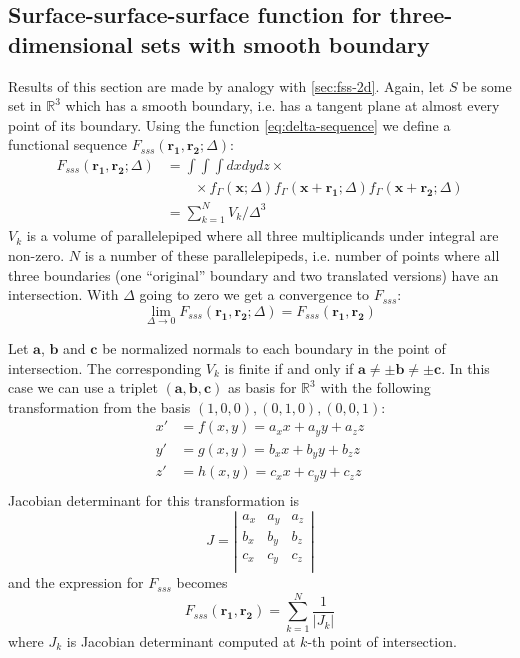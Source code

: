\documentclass[reprint,amsmath,amssymb,aps,pre,showkeys,showpacs]{revtex4-1}
\begin{document}
\subsection{Surface-surface-surface function for three-dimensional sets with
  smooth boundary}
\label{sec:fsss-3d}
Results of this section are made by analogy with \cref{sec:fss-2d}. Again, let
$S$ be some set in $\mathbb{R}^3$ which has a smooth boundary, i.e. has a
tangent plane at almost every point of its boundary. Using the function
\cref{eq:delta-sequence} we define a functional sequence
$F_{sss}(\bm{r_1}, \bm{r_2}; \Delta)$:
\begin{align*}
  F_{sss}(\bm{r_1}, \bm{r_2}; \Delta) &= \int\int\int dx dy dz \times \\
  &\qquad \times f_\Gamma(\bm{x}; \Delta) f_\Gamma(\bm{x} + \bm{r_1}; \Delta)
  f_\Gamma(\bm{x} + \bm{r_2}; \Delta) \\
  &= \sum_{k=1}^N V_k/\Delta^3
\end{align*}
$V_k$ is a volume of parallelepiped where all three multiplicands under integral
are non-zero. $N$ is a number of these parallelepipeds, i.e. number of points
where all three boundaries (one ``original'' boundary and two translated
versions) have an intersection. With $\Delta$ going to zero we get a convergence
to $F_{sss}$:
\begin{equation*}
  \lim_{\Delta \to 0} F_{sss}(\bm{r_1}, \bm{r_2}; \Delta) = F_{sss}(\bm{r_1},
  \bm{r_2})
\end{equation*}

Let $\bm{a}$, $\bm{b}$ and $\bm{c}$ be normalized normals to each boundary in
the point of intersection. The corresponding $V_k$ is finite if and only if
$\bm{a} \ne \pm \bm{b} \ne \pm \bm{c}$. In this case we can use a triplet
$(\bm{a}, \bm{b}, \bm{c})$ as basis for $\mathbb{R}^3$ with the following
transformation from the basis $(1,0,0), (0,1,0), (0, 0, 1)$:
\begin{align*}
  x' &= f(x, y) = a_x x + a_y y + a_z z \\
  y' &= g(x, y) = b_x x + b_y y + b_z z \\
  z' &= h(x, y) = c_x x + c_y y + c_z z \\
\end{align*}
Jacobian determinant for this transformation is
\begin{equation*}
  J = \left|
  \begin{array}{ccc}
    a_x & a_y & a_z \\
    b_x & b_y & b_z \\
    c_x & c_y & c_z \\
  \end{array}
  \right|
\end{equation*}
and the expression for $F_{sss}$ becomes
\begin{equation}
  F_{sss}(\bm{r_1}, \bm{r_2}) = \sum_{k=1}^N \frac{1}{|J_k|} \label{eq:fsss-3d}
\end{equation}
where $J_k$ is Jacobian determinant computed at $k$-th point of
intersection.
\end{document}
